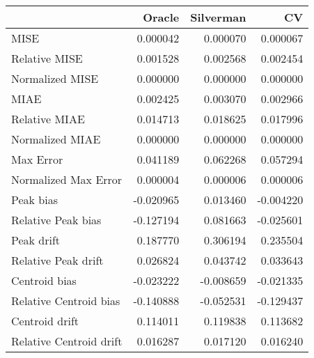 \begin{tabular}{lrrr}
  \hline
 & Oracle & Silverman & CV \\ 
  \hline
MISE & 0.000042 & 0.000070 & 0.000067 \\ 
  Relative MISE & 0.001528 & 0.002568 & 0.002454 \\ 
  Normalized MISE & 0.000000 & 0.000000 & 0.000000 \\ 
  MIAE & 0.002425 & 0.003070 & 0.002966 \\ 
  Relative MIAE & 0.014713 & 0.018625 & 0.017996 \\ 
  Normalized MIAE & 0.000000 & 0.000000 & 0.000000 \\ 
  Max Error & 0.041189 & 0.062268 & 0.057294 \\ 
  Normalized Max Error & 0.000004 & 0.000006 & 0.000006 \\ 
  Peak bias & -0.020965 & 0.013460 & -0.004220 \\ 
  Relative Peak bias & -0.127194 & 0.081663 & -0.025601 \\ 
  Peak drift & 0.187770 & 0.306194 & 0.235504 \\ 
  Relative Peak drift & 0.026824 & 0.043742 & 0.033643 \\ 
  Centroid bias & -0.023222 & -0.008659 & -0.021335 \\ 
  Relative Centroid bias & -0.140888 & -0.052531 & -0.129437 \\ 
  Centroid drift & 0.114011 & 0.119838 & 0.113682 \\ 
  Relative Centroid drift & 0.016287 & 0.017120 & 0.016240 \\ 
   \hline
\end{tabular}
